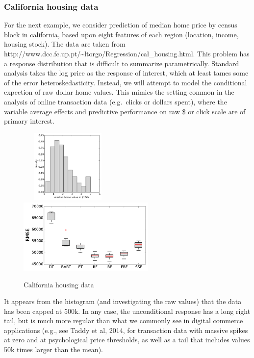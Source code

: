 \documentclass{article}
\begin{document}
    \subsubsection{California housing data}\label{california-housing-data}

For the next example, we consider prediction of median home price by
census block in california, based upon eight features of each region
(location, income, housing stock). The data are taken from
http://www.dcc.fc.up.pt/\textasciitilde{}ltorgo/Regression/cal\_housing.html.
This problem has a response distribution that is difficult to summarize
parametrically. Standard analysis takes the log price as the response of
interest, which at least tames some of the error heteroskedasticity.
Instead, we will attempt to model the conditional expection of raw
dollar home values. This mimics the setting common in the analysis of
online transaction data (e.g.~clicks or dollars spent), where the
variable average effects and predictive performance on raw \$ or click
scale are of primary interest.

\begin{figure}
~~~\includegraphics[width=0.325\textwidth]{../graphs/ca_hist}
~~~~~~~
\includegraphics[width=0.6\textwidth]{../graphs/ca_rmse}
\caption{California housing data}
\end{figure}
    
    It appears from the histogram (and investigating the raw values) that
the data has been capped at 500k. In any case, the unconditional
response has a long right tail, but is much more regular than what we
commonly see in digital commerce applications (e.g., see Taddy et al,
2014, for transaction data with massive spikes at zero and at
psychological price thresholds, as well as a tail that includes values
50k times larger than the mean).
\end{document}
